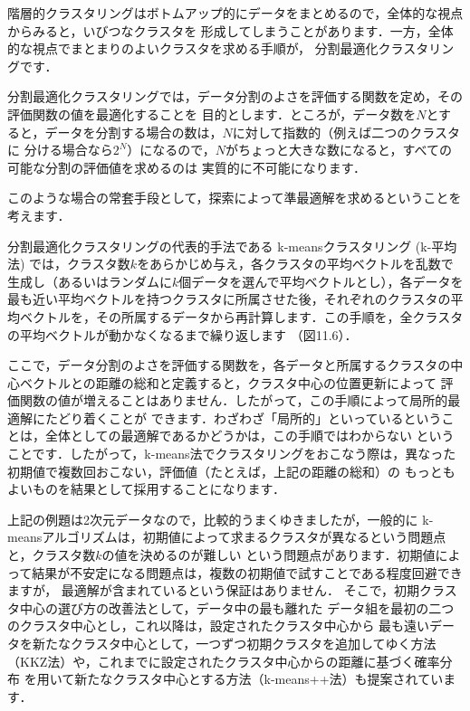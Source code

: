 
階層的クラスタリングはボトムアップ的にデータをまとめるので，全体的な視点からみると，いびつなクラスタを
形成してしまうことがあります．一方，全体的な視点でまとまりのよいクラスタを求める手順が，
分割最適化クラスタリングです．

分割最適化クラスタリングでは，データ分割のよさを評価する関数を定め，その評価関数の値を最適化することを
目的とします．ところが，データ数を$N$とすると，データを分割する場合の数は，$N$に対して指数的（例えば二つのクラスタに
分ける場合なら$2^N$）になるので，$N$がちょっと大きな数になると，すべての可能な分割の評価値を求めるのは
実質的に不可能になります．

このような場合の常套手段として，探索によって準最適解を求めるということを考えます．


分割最適化クラスタリングの代表的手法である
k-meansクラスタリング (k-平均法)
では，クラスタ数$k$をあらかじめ与え，各クラスタの平均ベクトルを乱数で生成し（あるいはランダムに$k$個データを選んで平均ベクトルとし），各データを
最も近い平均ベクトルを持つクラスタに所属させた後，それぞれのクラスタの平均ベクトルを，その所属するデータから再計算します．この手順を，全クラスタの平均ベクトルが動かなくなるまで繰り返します
（図11.6）．


ここで，データ分割のよさを評価する関数を，各データと所属するクラスタの中心ベクトルとの距離の総和と定義すると，クラスタ中心の位置更新によって
評価関数の値が増えることはありません．したがって，この手順によって局所的最適解にたどり着くことが
できます．わざわざ「局所的」といっているということは，全体としての最適解であるかどうかは，この手順ではわからない
ということです．したがって，k-means法でクラスタリングをおこなう際は，異なった初期値で複数回おこない，評価値（たとえば，上記の距離の総和）の
もっともよいものを結果として採用することになります．


上記の例題は2次元データなので，比較的うまくゆきましたが，一般的に
k-meansアルゴリズムは，初期値によって求まるクラスタが異なるという問題点と，クラスタ数$k$の値を決めるのが難しい
という問題点があります．初期値によって結果が不安定になる問題点は，複数の初期値で試すことである程度回避できますが，
最適解が含まれているという保証はありません．
そこで，初期クラスタ中心の選び方の改善法として，データ中の最も離れた
データ組を最初の二つのクラスタ中心とし，これ以降は，設定されたクラスタ中心から
最も遠いデータを新たなクラスタ中心として，一つずつ初期クラスタを追加してゆく方法
（KKZ法）や，これまでに設定されたクラスタ中心からの距離に基づく確率分布
を用いて新たなクラスタ中心とする方法（k-means++法）も提案されています．

